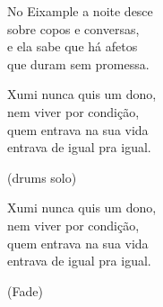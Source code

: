 \begin{lyrics}
No Eixample a noite desce\\
sobre copos e conversas,\\
e ela sabe que há afetos\\
que duram sem promessa.

Xumi nunca quis um dono,\\
nem viver por condição,\\
quem entrava na sua vida\\
entrava de igual pra igual.

(drums solo)

Xumi nunca quis um dono,\\
nem viver por condição,\\
quem entrava na sua vida\\
entrava de igual pra igual.

(Fade)

\end{lyrics}

